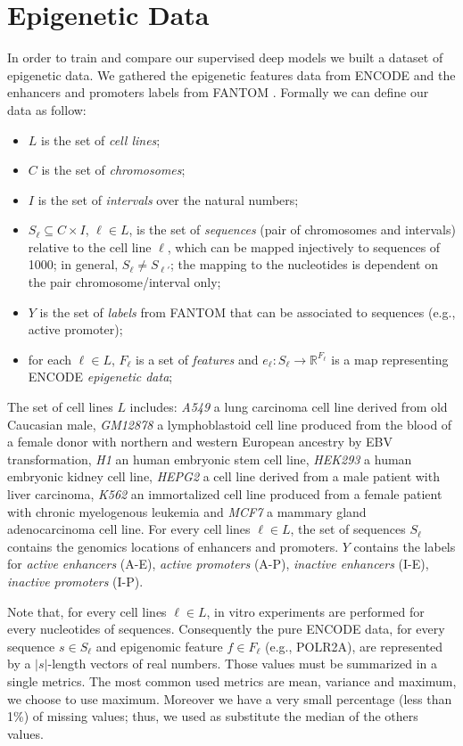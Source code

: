 \section{Epigenetic Data}
In order to train and compare our supervised deep models we built a
dataset of epigenetic data. We gathered the epigenetic features data from
ENCODE \cite{ENCODE_data} and the enhancers and promoters labels from
FANTOM \cite{FANTOM_data}. Formally we can define our data as follow: 
\begin{itemize}
    \item $L$ is the set of \emph{cell lines};
    \item $C$ is the set of \emph{chromosomes};
    \item $I$ is the set of \emph{intervals} over the natural numbers;
    \item $S_\ell\subseteq C\times I$, $\ell\in L$, is the set of \emph{sequences} (pair of chromosomes and intervals) relative to the cell line $\ell$, which can be mapped injectively to sequences of 1000; in general, $S_\ell\neq S_{\ell'}$; the mapping to the nucleotides is dependent on the pair chromosome/interval only;
    \item $Y$ is the set of \emph{labels} from FANTOM that can be associated to sequences (e.g., active promoter);
    \item for each $\ell\in L$, $F_\ell$ is a set of \emph{features} and $e_\ell:S_\ell\to\mathbb R^{F_\ell}$ is a map representing ENCODE \emph{epigenetic data};
\end{itemize}
The set of cell lines $L$ includes: \emph{A549} a lung carcinoma cell line derived from old Caucasian male, \emph{GM12878} a lymphoblastoid cell line produced from the blood of a female donor with northern and western European ancestry by EBV transformation, \emph{H1} an human embryonic stem cell line, \emph{HEK293} a human embryonic kidney cell line, \emph{HEPG2} a cell line derived from a male patient with liver carcinoma, \emph{K562} an immortalized cell line produced from a female patient with chronic myelogenous leukemia and \emph{MCF7} a mammary gland adenocarcinoma cell line. For every cell lines $\ell \in L$, the set of sequences $S_\ell$ contains the genomics locations of enhancers and promoters. $Y$ contains the labels for \emph{active enhancers} (A-E), \emph{active promoters} (A-P), \emph{inactive enhancers} (I-E), \emph{inactive promoters} (I-P).

Note that, for every cell lines $\ell \in L$, in vitro experiments are
performed for every nucleotides of sequences. Consequently the pure ENCODE
data, for every sequence $s \in S_\ell$ and epigenomic feature $f \in
F_\ell$ (e.g., POLR2A), are represented by a $|s|$-length vectors of real
numbers. Those values must be summarized in a single metrics. The most
common used metrics are mean, variance and maximum, we choose to use
maximum. Moreover we have a very small percentage (less than 1\%) of
missing values; thus, we used as substitute the median of the others
values.

